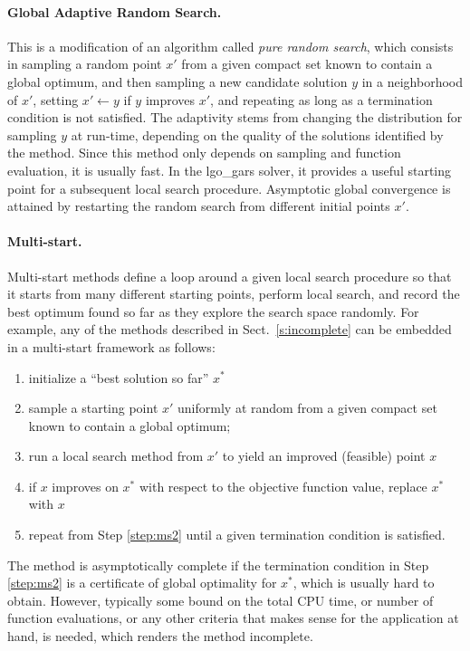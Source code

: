 \paragraph{Global Adaptive Random Search.}
%
This is a modification of an algorithm called {\it pure random search}, which consists in sampling a random point $x'$ from a given compact set known to contain a global optimum, and then sampling a new candidate solution $y$ in a neighborhood of $x'$, setting $x' \leftarrow y$ if $y$ improves $x'$, and repeating as long as a termination condition is not satisfied. The adaptivity stems from changing the distribution for sampling $y$ at run-time, depending on the quality of the solutions identified by the method. Since this method only depends on sampling and function evaluation, it is usually fast. In the {\sc lgo\_gars} solver, it provides a useful starting point for a subsequent local search procedure. Asymptotic global convergence is attained by restarting the random search from different initial points $x'$. 

\paragraph{Multi-start.}
%
Multi-start methods define a loop around a given local search procedure so that it starts from many different starting points, perform local search, and record the best optimum found so far as they explore the search space randomly. For example, any of the methods described in Sect.~\ref{s:incomplete} can be embedded in a multi-start framework as follows:
%
\begin{enumerate}
 \item initialize a ``best solution so far'' $x^\ast$ 
 \item sample a starting point $x'$ uniformly at random from a given compact set known to contain a global optimum; \label{step:ms2}
 \item run a local search method from $x'$ to yield an improved (feasible) point $x$
 \item if $x$ improves on $x^\ast$ with respect to the objective function value, replace $x^\ast$ with $x$
 \item repeat from Step \ref{step:ms2} until a given termination condition is satisfied. \label{step:ms5}
\end{enumerate}
%
The method is asymptotically complete if the termination condition in Step \ref{step:ms2} is a certificate of global optimality for $x^\ast$, which is usually hard to obtain. However, typically some bound on the total CPU time, or number of function evaluations, or any other criteria that makes sense for the application at hand, is needed, which renders the method incomplete.

